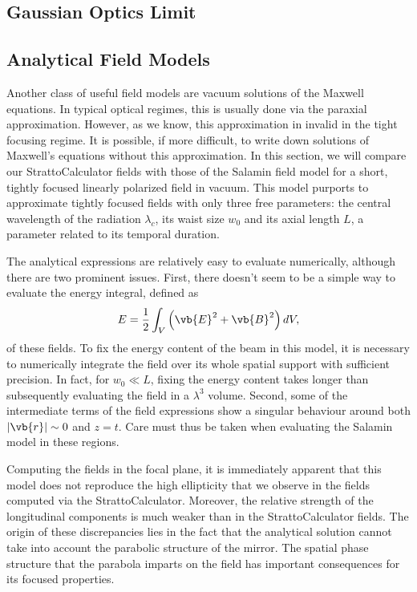 \documentclass[11pt,SymmetricalJury]{inrsthesis/inrsthesis}
\begin{document}
\subsection{Gaussian Optics Limit}

\subsection{Analytical Field Models}

Another class of useful field models are vacuum solutions of the Maxwell
equations. In typical optical regimes, this is usually done via the paraxial
approximation. However, as we know, this approximation in invalid in the tight
focusing regime. It is possible, if more difficult, to write down solutions of
Maxwell's equations without this approximation. In this section, we will compare
our StrattoCalculator fields with those of the Salamin field model
\cite{Salamin2015b} for a short, tightly focused linearly polarized field in
vacuum. This model purports to approximate tightly focused fields with only
three free parameters: the central wavelength of the radiation $\lambda_c$, its
waist size $w_0$ and its axial length $L$, a parameter related to its temporal
duration.

The analytical expressions are relatively easy to evaluate numerically, although
there are two prominent issues. First, there doesn't seem to be a simple way to
evaluate the energy integral, defined as
  \begin{equation}
    E = \frac{1}{2}\int_V \left(\vb{E}^2+\vb{B}^2\right) dV,
  \end{equation}
of these fields. To fix the energy content of the beam in this model, it is
necessary to numerically integrate the field over its whole spatial support with
sufficient precision. In fact, for $w_0\ll L$, fixing the energy content takes
longer than subsequently evaluating the field in a $\lambda^3$ volume. Second,
some of the intermediate terms of the field expressions show a singular
behaviour around both $|\vb{r}|\sim0$ and $z=t$. Care must thus be taken when
evaluating the Salamin model in these regions.

Computing the fields in the focal plane, it is immediately apparent that this
model does not reproduce the high ellipticity that we observe in the fields
computed via the StrattoCalculator. Moreover, the relative strength of the
longitudinal components is much weaker than in the StrattoCalculator fields. The
origin of these discrepancies lies in the fact that the analytical solution
cannot take into account the parabolic structure of the mirror. The spatial
phase structure that the parabola imparts on the field has important
consequences for its focused properties.
\end{document}

